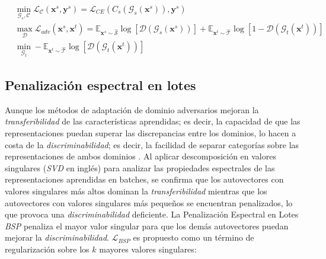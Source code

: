 \begin{align}
   & \min_{\mathcal{G}_s, \mathcal{C}} \mathcal{L}_\mathcal{C}(\mathbf{x}^s, \mathbf{y}^s)                                                            = \mathcal{L}_{CE}(C_s(\mathcal{G}_s(\mathbf{x}^s)), \mathbf{y}^s)
  \label{eq:adda-loss-clasificadora}                                                                                                                                                                                                                                                                                                                                                          \\
   & \max_{\mathcal{D}} \mathcal{L}_{adv}(\mathbf{x}^s, \mathbf{x}^t)                                                                                 = \mathbb{E}_{\mathbf{x}^s \sim \mathcal{\hat{S}}}\log[\mathcal{D}(\mathcal{G}_s(\mathbf{x}^s))] + \mathbb{E}_{\mathbf{x}^t \sim \mathcal{\hat{T}}}\log[1-\mathcal{D}(\mathcal{G}_t(\mathbf{x}^t))] \label{eq:adda-loss-discriminadora} \\
   & \min_{\mathcal{G}_t} - \mathbb{E}_{\mathbf{x}^t \sim \mathcal{\hat{T}}} \log[\mathcal{D}(\mathcal{G}_t(\mathbf{x}^t))]  \label{eq:adda-objetivo}
\end{align}

\subsection{Penalización espectral en lotes}

Aunque los métodos de adaptación de dominio adversarios mejoran la {\it transferibilidad} de las características
aprendidas; es decir, la capacidad de que las representaciones puedan superar las discrepancias entre los dominios, lo
hacen a costa de la {\it discriminabilidad}; es decir, la facilidad de separar categorías sobre las representaciones de
ambos dominios \parencite{chen2019transferability}. Al aplicar descomposición en valores singulares ({\it SVD} en inglés) para analizar
las propiedades espectrales de las representaciones aprendidas en batches, se confirma que los autovectores con valores
singulares más altos dominan la {\it transferibilidad} mientras que los autovectores con valores singulares más
pequeños se encuentran penalizados, lo que provoca una {\it discriminabilidad} deficiente. La Penalización Espectral en
Lotes {\it BSP} \parencite{chen2019transferability} penaliza el mayor valor singular para que los demás autovectores puedan mejorar la {\it
    discriminabilidad}. $\mathcal{L}_{BSP}$ es propuesto como un término de regularización sobre los $k$ mayores valores
singulares:

